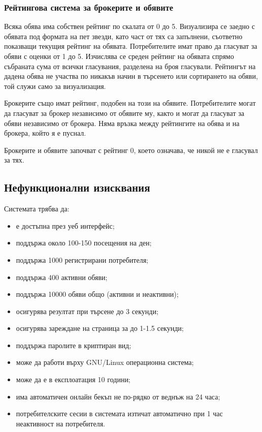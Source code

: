 \documentclass[a4paper]{article}
\begin{document}
\subsubsection{Рейтингова система за брокерите и обявите}

Всяка обява има собствен рейтинг по скалата от 0 до 5. Визуализира се заедно с обявата под формата на пет звезди, като част от тях са запълнени, съответно показващи текущия рейтинг на обявата. Потребителите имат право да гласуват за обяви с оценки от 1 до 5. Изчислява се среден рейтинг на обявата спрямо събраната сума от всички гласувания, разделена на броя гласували. Рейтингът на дадена обява не участва по никакъв начин в търсенето или сортирането на обяви, той служи само за визуализация. 

Брокерите също имат рейтинг, подобен на този на обявите. Потребителите могат да гласуват за брокер независимо от обявите му, както и могат да гласуват за обяви независимо от брокера. Няма връзка между рейтингите на обява и на брокера, който я е пуснал. 

Брокерите и обявите започват с рейтинг 0, което означава, че никой не е гласувал за тях. 



\subsection{Нефункционални изисквания}
	
Системата трябва да:
	\begin{itemize}
	\item е достъпна през уеб интерфейс;
	\item поддържа около 100-150 посещения на ден;
	\item поддържа 1000 регистрирани потребителя;
	\item поддържа 400 активни обяви;
	\item поддържа 10000 обяви общо (активни и неактивни);
	\item осигурява резултат при търсене до 3 секунди;
	\item осигурява зареждане на страница за до 1-1.5 секунди;
	\item поддържа паролите в криптиран вид;
	\item може да работи върху GNU/Linux операционна система;
	\item може да е в експлоатация 10 години;
	\item има автоматичен онлайн бекъп не по-рядко от веднъж на 24 часа;
	\item потребителските сесии в системата изтичат автоматично при 1 час неактивност на потребителя.
	\end{itemize}
		
\end{document}
